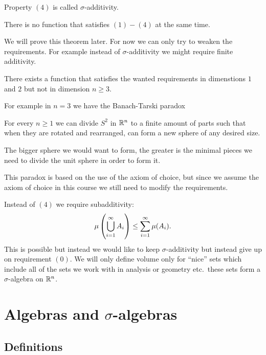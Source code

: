 \documentclass[11pt,a4paper]{article}
\begin{document}
\begin{remark}
  Property $(4)$ is called $\sigma$-additivity.
\end{remark}

\begin{theorem}[Hausdorrf, 1914]
  There is no function that satisfies $(1) - (4)$ at the same time.
\end{theorem}

We will prove this theorem later.
For now we can only try to weaken the requirements.
For example instead of $\sigma$-additivity we might require finite
additivity.

\begin{theorem}
  There exists a function that satisfies the wanted requirements in
  dimenstions $1$ and $2$ but not in dimension $n \geq 3$.
\end{theorem}

For example in $n = 3$ we have the Banach-Tarski paradox

\begin{paradox}
  For every $n \geq 1$ we can divide $S^2$ in $\mathbb{R}^n$ to a finite amount 
  of parts such that when they are rotated and rearranged,
  can form a new sphere of any desired size.
\end{paradox}
\begin{remark}
  The bigger sphere we would want to form, the greater is the minimal
  pieces we need to divide the unit sphere in order to form it.
\end{remark}

This paradox is based on the use of the axiom of choice, but since we
assume the axiom of choice in this course we still need to modify the
requirements.

Instead of $(4)$ we require subadditivity:
\[
\mu\del{\bigcup_{i=1}^{\infty} A_i} \le \sum_{i=1}^{\infty} \mu(A_i).
\]
This is possible but instead we would like to keep $\sigma$-additivity
but instead give up on requirement $(0)$.
We will only define volume only for ``nice'' sets which include
all of the sets we work with in analysis or geometry etc.\ these
sets form a $\sigma$-algebra on $\mathbb{R}^n$.

\section{Algebras and \texorpdfstring{$\sigma$}{s}-algebras}

\subsection{Definitions}
\end{document}
